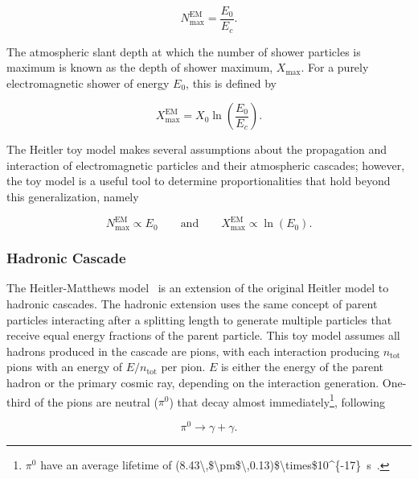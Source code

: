 \begin{equation}
    N_{\text{max}}^{\text{EM}} = \frac{E_{0}}{E_{c}}. \label{eq:em_particle_maximum}
\end{equation}

\noindent
The atmospheric slant depth at which the number of shower particles is maximum is known as the depth of shower maximum, $X_{\text{max}}$.
For a purely electromagnetic shower of energy $E_{0}$, this is defined by

\begin{equation}
    X_{\text{max}}^{\text{EM}} = X_{0} \ln\left( \frac{E_{0}}{E_{c}} \right). \label{eq:em_xmax}
\end{equation}

\noindent
The Heitler toy model makes several assumptions about the propagation and interaction of electromagnetic particles and their atmospheric cascades; however, the toy model is a useful tool to determine proportionalities that hold beyond this generalization, namely

\begin{equation}
    N_{\text{max}}^{\text{EM}} \propto E_{0} \qquad \text{and} \qquad X_{\text{max}}^{\text{EM}} \propto \ln\left(E_{0}\right). \label{eq:em_proportionalities}
\end{equation}

\subsubsection{Hadronic Cascade}\label{sssec:hadronic}
The Heitler-Matthews model~\cite{matthews_astropartphys2005_heitlermatthews} is an extension of the original Heitler model to hadronic cascades.
The hadronic extension uses the same concept of parent particles interacting after a splitting length to generate multiple particles that receive equal energy fractions of the parent particle.
This toy model assumes all hadrons produced in the cascade are pions, with each interaction producing $n_{\text{tot}}$ pions with an energy of $E / n_{\text{tot}}$ per pion.
$E$ is either the energy of the parent hadron or the primary cosmic ray, depending on the interaction generation.
One-third of the pions are neutral ($\pi^{0}$) that decay almost immediately\footnote[5]{$\pi^{0}$ have an average lifetime of \qty[parse-numbers=false]{(8.43\,$\pm$\,0.13)$\times$10^{-17}}{\second}~\cite{pdg_2026_review}.}, following

\begin{equation}
    \pi^{0} \rightarrow \gamma + \gamma. \label{eq:pion_pairproduction}
\end{equation}

